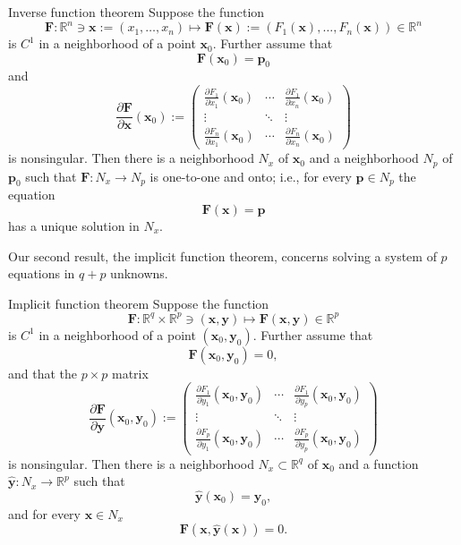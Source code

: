 \begin{Theorem}{Inverse function theorem}
\label{thm:inverse-function}
Suppose the function
\[
\mathbf{F}:\mathbb{R}^n\ni\mathbf{x}:=(x_1,\ldots,x_n)\mapsto\mathbf{F}(\mathbf{x}):=(F_1(\mathbf{x}),\ldots,F_n(\mathbf{x}))\in\mathbb{R}^n
\]
is $C^1$ in a neighborhood of a point $\mathbf{x}_0$. Further assume that
\[
\mathbf{F}(\mathbf{x}_0)=\mathbf{p}_0
\]
and
\[
\frac{\partial\mathbf{F}}{\partial\mathbf{x}}(\mathbf{x}_0):=
\begin{pmatrix}
\frac{\partial F_1}{\partial x_1}(\mathbf{x}_0)&\cdots&\frac{\partial F_1}{\partial x_n}(\mathbf{x}_0)\\
\vdots&\ddots&\vdots\\
\frac{\partial F_n}{\partial x_1}(\mathbf{x}_0)&\cdots&\frac{\partial F_n}{\partial x_n}(\mathbf{x}_0)
\end{pmatrix}
\]
is nonsingular. Then there is a neighborhood $N_x$ of $\mathbf{x}_0$ and a neighborhood $N_p$ of $\mathbf{p}_0$ such that $\mathbf{F}:N_x\to N_p$ is one-to-one and onto; i.e., for every $\mathbf{p}\in N_p$ the equation
\[
\mathbf{F}(\mathbf{x})=\mathbf{p}
\]
has a unique solution in $N_x$.
\end{Theorem}

Our second result, the implicit function theorem, concerns solving a system of $p$ equations in $q+p$ unknowns.

\begin{Theorem}{Implicit function theorem}
\label{thm:implicit-function}
Suppose the function
\[
\mathbf{F}:\mathbb{R}^q\times\mathbb{R}^p\ni(\mathbf{x},\mathbf{y})\mapsto\mathbf{F}(\mathbf{x},\mathbf{y})\in\mathbb{R}^p
\]
is $C^1$ in a neighborhood of a point $(\mathbf{x}_0,\mathbf{y}_0)$. Further assume that
\[
\mathbf{F}(\mathbf{x}_0,\mathbf{y}_0)=0,
\]
and that the $p\times p$ matrix
\[
\frac{\partial\mathbf{F}}{\partial\mathbf{y}}(\mathbf{x}_0,\mathbf{y}_0):=
\begin{pmatrix}
\frac{\partial F_1}{\partial y_1}(\mathbf{x}_0,\mathbf{y}_0)&\cdots&\frac{\partial F_1}{\partial y_p}(\mathbf{x}_0,\mathbf{y}_0)\\
\vdots&\ddots&\vdots\\
\frac{\partial F_p}{\partial y_1}(\mathbf{x}_0,\mathbf{y}_0)&\cdots&\frac{\partial F_p}{\partial y_p}(\mathbf{x}_0,\mathbf{y}_0)
\end{pmatrix}
\]
is nonsingular. Then there is a neighborhood $N_x\subset\mathbb{R}^q$ of $\mathbf{x}_0$ and a function $\hat{\mathbf{y}}:N_x\to\mathbb{R}^p$ such that
\[
\hat{\mathbf{y}}(\mathbf{x}_0)=\mathbf{y}_0,
\]
and for every $\mathbf{x}\in N_x$
\[
\mathbf{F}(\mathbf{x},\hat{\mathbf{y}}(\mathbf{x}))=0.
\]
\end{Theorem}

